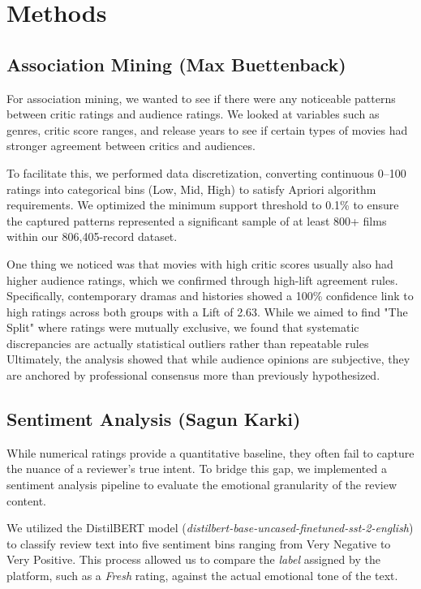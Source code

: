 \documentclass[conference]{IEEEtran}
\begin{document}
\section{Methods}
\subsection{Association Mining (Max Buettenback)}
For association mining, we wanted to see if there were any noticeable patterns between critic ratings and audience ratings. We looked at variables such as genres, critic score ranges, and release years to see if certain types of movies had stronger agreement between critics and audiences.

To facilitate this, we performed data discretization, converting continuous 0--100 ratings into categorical bins (Low, Mid, High) to satisfy Apriori algorithm requirements. We optimized the minimum support threshold to 0.1\% to ensure the captured patterns represented a significant sample of at least 800+ films within our 806,405-record dataset.

One thing we noticed was that movies with high critic scores usually also had higher audience ratings, which we confirmed through high-lift agreement rules. Specifically, contemporary dramas and histories showed a 100\% confidence link to high ratings across both groups with a Lift of 2.63. While we aimed to find "The Split" where ratings were mutually exclusive, we found that systematic discrepancies are actually statistical outliers rather than repeatable rules Ultimately, the analysis showed that while audience opinions are subjective, they are anchored by professional consensus more than previously hypothesized.

\subsection{Sentiment Analysis (Sagun Karki)}
While numerical ratings provide a quantitative baseline, they often fail to capture the nuance of a reviewer's true intent. To bridge this gap, we implemented a sentiment analysis pipeline to evaluate the emotional granularity of the review content.


We utilized the DistilBERT model (\textit{distilbert-base-uncased-finetuned-sst-2-english}) to classify review text into five sentiment bins ranging from Very Negative to Very Positive. This process allowed us to compare the \textit{label} assigned by the platform, such as a \textit{Fresh} rating, against the actual emotional tone of the text.
\end{document}
